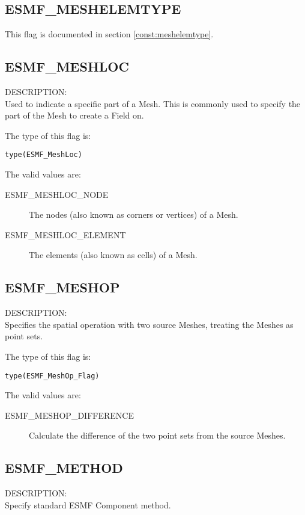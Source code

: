 \subsection{ESMF\_MESHELEMTYPE}
This flag is documented in section \ref{const:meshelemtype}.

\subsection{ESMF\_MESHLOC}
\label{const:meshloc}
{\sf DESCRIPTION:\\}  
Used to indicate a specific part of a Mesh. This is commonly used to specify the part of the Mesh to
create a Field on. 

The type of this flag is:

{\tt type(ESMF\_MeshLoc)}

The valid values are:
\begin{description}

\item [ESMF\_MESHLOC\_NODE]
         The nodes (also known as corners or vertices) of a Mesh. 

\item [ESMF\_MESHLOC\_ELEMENT]
         The elements (also known as cells) of a Mesh. 
\end{description}


\subsection{ESMF\_MESHOP}
\label{const:meshop}
{\sf DESCRIPTION:\\}  
Specifies the spatial operation with two source Meshes, treating the Meshes as point sets.

The type of this flag is:

{\tt type(ESMF\_MeshOp\_Flag)}

The valid values are:
\begin{description}

\item [ESMF\_MESHOP\_DIFFERENCE]
         Calculate the difference of the two point sets from the source Meshes.
\end{description}

\subsection{ESMF\_METHOD}
\label{const:method}

{\sf DESCRIPTION:\\}  
Specify standard ESMF Component method.

